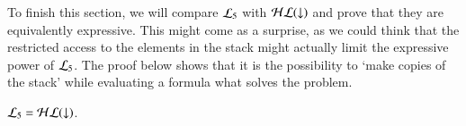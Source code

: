 %

To finish this section, we will compare $\mathcal{L}_5$ with $\mathcal{HL}({\downarrow})$ and
prove that they are equivalently expressive.  This might come as a
surprise, as we could think that the restricted access to the elements
in the stack might actually limit the expressive power of $\mathcal{L}_5$.
The proof below shows that it is the possibility to `make copies of
the stack' while evaluating a formula what solves the problem.

\begin{thm}\label{prop:stack_leq_hl}
$\mathcal{L}_5 = \mathcal{HL}({\downarrow})$.
\end{thm}


